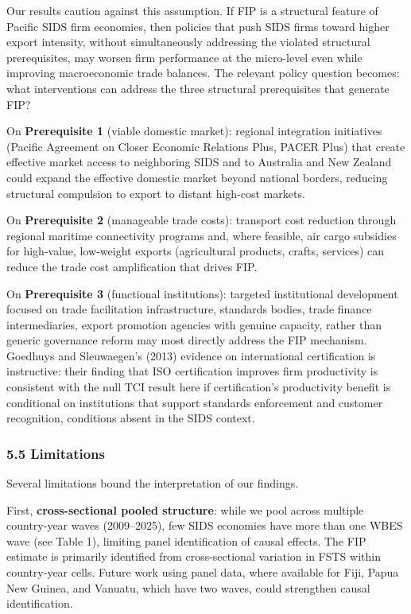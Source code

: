 \documentclass[
  12pt,a4paper]{article}
\begin{document}
Our results caution against this assumption. If FIP is a structural
feature of Pacific SIDS firm economies, then policies that push SIDS
firms toward higher export intensity, without simultaneously addressing
the violated structural prerequisites, may worsen firm performance at
the micro-level even while improving macroeconomic trade balances. The
relevant policy question becomes: what interventions can address the
three structural prerequisites that generate FIP?

On \textbf{Prerequisite 1} (viable domestic market): regional
integration initiatives (Pacific Agreement on Closer Economic Relations
Plus, PACER Plus) that create effective market access to neighboring
SIDS and to Australia and New Zealand could expand the effective
domestic market beyond national borders, reducing structural compulsion
to export to distant high-cost markets.

On \textbf{Prerequisite 2} (manageable trade costs): transport cost
reduction through regional maritime connectivity programs and, where
feasible, air cargo subsidies for high-value, low-weight exports
(agricultural products, crafts, services) can reduce the trade cost
amplification that drives FIP.

On \textbf{Prerequisite 3} (functional institutions): targeted
institutional development focused on trade facilitation infrastructure,
standards bodies, trade finance intermediaries, export promotion
agencies with genuine capacity, rather than generic governance reform
may most directly address the FIP mechanism. Goedhuys and Sleuwaegen's
(2013) evidence on international certification is instructive: their
finding that ISO certification improves firm productivity is consistent
with the null TCI result here if certification's productivity benefit is
conditional on institutions that support standards enforcement and
customer recognition, conditions absent in the SIDS context.

\hypertarget{limitations}{%
\subsubsection{5.5 Limitations}\label{limitations}}

Several limitations bound the interpretation of our findings.

First, \textbf{cross-sectional pooled structure}: while we pool across
multiple country-year waves (2009--2025), few SIDS economies have more
than one WBES wave (see Table 1), limiting panel identification of
causal effects. The FIP estimate is primarily identified from
cross-sectional variation in FSTS within country-year cells. Future work
using panel data, where available for Fiji, Papua New Guinea, and
Vanuatu, which have two waves, could strengthen causal identification.
\end{document}
